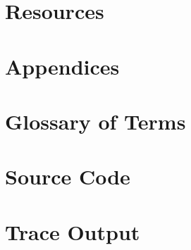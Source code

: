 \chapter{Resources}
\nocite{*}



\chapter{Appendices}
\appendix

\chapter{Glossary of Terms}\label{sec:glosterm}
\printglossaries

\newpage
\chapter{Source Code}\label{sec:srccode}

\newpage
\chapter{Trace Output}\label{sec:traceout}



